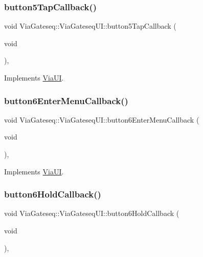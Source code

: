 \subsubsection{\texorpdfstring{button5\+Tap\+Callback()}{button5TapCallback()}}
{\footnotesize\ttfamily void Via\+Gateseq\+::\+Via\+Gateseq\+U\+I\+::button5\+Tap\+Callback (\begin{DoxyParamCaption}\item[{void}]{ }\end{DoxyParamCaption})\hspace{0.3cm}{\ttfamily [override]}, {\ttfamily [virtual]}}



Implements \mbox{\hyperlink{class_via_u_i_a5066c22385f31c24ec939d680a66a628}{Via\+UI}}.

\mbox{\label{class_via_gateseq_1_1_via_gateseq_u_i_adf289572ed287fdc4c9ff4029f008b7b}} 
\subsubsection{\texorpdfstring{button6\+Enter\+Menu\+Callback()}{button6EnterMenuCallback()}}
{\footnotesize\ttfamily void Via\+Gateseq\+::\+Via\+Gateseq\+U\+I\+::button6\+Enter\+Menu\+Callback (\begin{DoxyParamCaption}\item[{void}]{ }\end{DoxyParamCaption})\hspace{0.3cm}{\ttfamily [override]}, {\ttfamily [virtual]}}



Implements \mbox{\hyperlink{class_via_u_i_ae59e7ff3a6ba1f641a4a916e47a26513}{Via\+UI}}.

\mbox{\label{class_via_gateseq_1_1_via_gateseq_u_i_ae16a0091338c515aa625c8738de1752b}} 
\subsubsection{\texorpdfstring{button6\+Hold\+Callback()}{button6HoldCallback()}}
{\footnotesize\ttfamily void Via\+Gateseq\+::\+Via\+Gateseq\+U\+I\+::button6\+Hold\+Callback (\begin{DoxyParamCaption}\item[{void}]{ }\end{DoxyParamCaption})\hspace{0.3cm}{\ttfamily [override]}, {\ttfamily [virtual]}}



